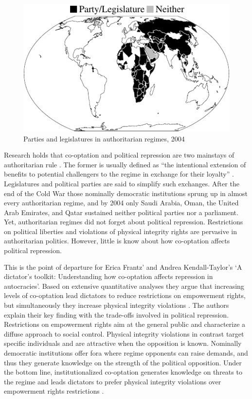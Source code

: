 \begin{figure}
\centering
\includegraphics[width=\linewidth]{./sections/01intro/worldmapTermpaperIntro.pdf}
\caption{Parties and legislatures in authoritarian regimes, 2004}
\label{fig:worldmapIntro}
\end{figure}
Research holds that co-optation and political repression
are two mainstays of authoritarian rule
\citep[21f.]{Gerschewski.2013}. The former is usually 
defined as ``the intentional extension of benefits to 
potential challengers to the regime in exchange for their 
loyalty'' \citep[333]{Frantz.2014}. Legislatures and 
political parties are said to simplify such exchanges. After
the end of the Cold War those nominally democratic
institutions sprung up in almost every authoritarian
regime, and by 2004 only Saudi Arabia, Oman, the
United Arab Emirates, and Qatar sustained neither political 
parties nor a parliament. Yet, authoritarian regimes did not 
forget about political repression. Restrictions on 
political liberties and violations of physical integrity 
rights are pervasive in authoritarian politics. However,
little is know about how co-optation affects political 
repression.

This is the point of departure for Erica Frantz' and Andrea 
Kendall-Taylor's \citeyearpar{Frantz.2014} `A dictator’s 
toolkit: Understanding how co-optation affects repression in 
autocracies'. Based on extensive quantitative analyses they 
argue that increasing levels of co-optation lead dictators 
to reduce restrictions on empowerment rights, but 
simultaneously they increase physical integrity violations
\citep[332]{Frantz.2014}. The authors explain their 
key finding with the trade-offs involved in political 
repression. Restrictions on empowerment rights aim at the 
general public and characterize a diffuse approach to
social control. Physical integrity violations in contrast 
target specific individuals and are attractive when the 
opposition is known. Nominally democratic institutions offer
fora where regime opponents can raise demands, and
thus they generate knowledge on the strength of the 
political opposition. Under the bottom line, 
institutionalized co-optation generates knowledge on threats
to the regime and leads dictators to prefer physical 
integrity violations over empowerment rights restrictions 
\citep[337]{Frantz.2014}.


